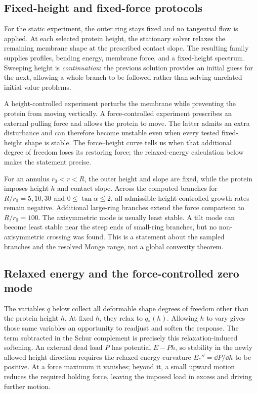 \subsection{Fixed-height and fixed-force protocols}
For the static experiment, the outer ring stays fixed and no tangential flow is applied. At each selected protein height, the stationary solver relaxes the remaining membrane shape at the prescribed contact slope. The resulting family supplies profiles, bending energy, membrane force, and a fixed-height spectrum. Sweeping height is \emph{continuation}: the previous solution provides an initial guess for the next, allowing a whole branch to be followed rather than solving unrelated initial-value problems.

A height-controlled experiment perturbs the membrane while preventing the protein from moving vertically. A force-controlled experiment prescribes an external pulling force and allows the protein to move. The latter admits an extra disturbance and can therefore become unstable even when every tested fixed-height shape is stable. The force--height curve tells us when that additional degree of freedom loses its restoring force; the relaxed-energy calculation below makes the statement precise.


For an annulus $r_0<r<R$, the outer height and slope are fixed, while the protein imposes height $h$ and contact slope. Across the computed branches for $R/r_0=5,10,30$ and $0\leq\tan\alpha\leq2$, all admissible height-controlled growth rates remain negative. Additional large-ring branches extend the force comparison to $R/r_0=100$. The axisymmetric mode is usually least stable. A tilt mode can become least stable near the steep ends of small-ring branches, but no non-axisymmetric crossing was found. This is a statement about the sampled branches and the resolved Monge range, not a global convexity theorem.


\subsection{Relaxed energy and the force-controlled zero mode}


The variables $q$ below collect all deformable shape degrees of freedom other than the protein height $h$. At fixed $h$, they relax to $q_*(h)$. Allowing $h$ to vary gives those same variables an opportunity to readjust and soften the response. The term subtracted in the Schur complement is precisely this relaxation-induced softening. An external dead load $P$ has potential $E-P h$, so stability in the newly allowed height direction requires the relaxed energy curvature $E_*''=\dd P/\dd h$ to be positive. At a force maximum it vanishes; beyond it, a small upward motion reduces the required holding force, leaving the imposed load in excess and driving further motion.


